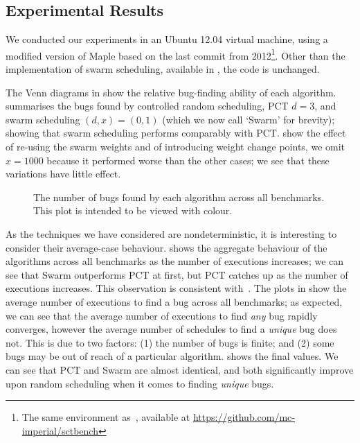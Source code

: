 \subsection{Experimental Results}
\label{sec:algorithms-eval-results}

We conducted our experiments in an Ubuntu 12.04 virtual machine, using a
modified version of Maple based on the last commit from 2012\footnote{The same
environment as~\cite{thomson2016}, available
at \url{https://github.com/mc-imperial/sctbench}}.  Other than the
implementation of swarm scheduling, available in , the code is
unchanged.

The Venn diagrams in  show the relative bug-finding ability of
each algorithm.   summarises the bugs found by controlled
random scheduling, PCT $d=3$, and swarm scheduling $(d,x)=(0,1)$ (which we now
call `Swarm' for brevity); showing that swarm scheduling performs comparably
with PCT.   show the effect of re-using
the swarm weights and of introducing weight change points, we omit $x=1000$
because it performed worse than the other cases; we see that these variations
have little effect.

\begin{figure}
  \centering
  
  \caption[Plot of bugs found by each scheduling algorithm.]{The number of bugs found by each algorithm across all benchmarks.  This plot is intended to be viewed with colour.}\label{fig:totalbugs}
\end{figure}

As the techniques we have considered are nondeterministic, it is interesting to
consider their average-case behaviour.   shows the aggregate
behaviour of the algorithms across all benchmarks as the number of executions
increases; we can see that Swarm outperforms PCT at first, but PCT catches up
as the number of executions increases.  This observation is consistent
with~\cite{thomson2016}.  The plots in  show the average number
of executions to find a bug across all benchmarks; as expected, we can see that
the average number of executions to find \emph{any} bug rapidly converges,
however the average number of schedules to find a \emph{unique} bug does not.
This is due to two factors: (1) the number of bugs is finite; and (2) some bugs
may be out of reach of a particular algorithm.   shows the final
values.  We can see that PCT and Swarm are almost identical, and both
significantly improve upon random scheduling when it comes to
finding \emph{unique} bugs.


